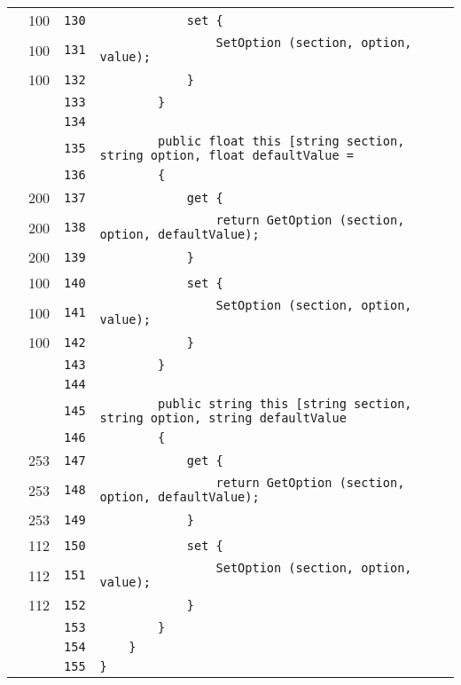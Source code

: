 \documentclass[a4paper,10pt]{article}
\begin{document}
\begin{longtable}[l]{lrrl}
\cellcolor{green} & 100 & \verb~130~ & \verb~            set {~\\
\cellcolor{green} & 100 & \verb~131~ & \verb~                SetOption (section, option, value);~\\
\cellcolor{green} & 100 & \verb~132~ & \verb~            }~\\
\cellcolor{gray} &  & \verb~133~ & \verb~        }~\\
\cellcolor{gray} &  & \verb~134~ & \verb~~\\
\cellcolor{gray} &  & \verb~135~ & \verb~        public float this [string section, string option, float defaultValue =~\\
\cellcolor{gray} &  & \verb~136~ & \verb~        {~\\
\cellcolor{green} & 200 & \verb~137~ & \verb~            get {~\\
\cellcolor{green} & 200 & \verb~138~ & \verb~                return GetOption (section, option, defaultValue);~\\
\cellcolor{green} & 200 & \verb~139~ & \verb~            }~\\
\cellcolor{green} & 100 & \verb~140~ & \verb~            set {~\\
\cellcolor{green} & 100 & \verb~141~ & \verb~                SetOption (section, option, value);~\\
\cellcolor{green} & 100 & \verb~142~ & \verb~            }~\\
\cellcolor{gray} &  & \verb~143~ & \verb~        }~\\
\cellcolor{gray} &  & \verb~144~ & \verb~~\\
\cellcolor{gray} &  & \verb~145~ & \verb~        public string this [string section, string option, string defaultValue~\\
\cellcolor{gray} &  & \verb~146~ & \verb~        {~\\
\cellcolor{green} & 253 & \verb~147~ & \verb~            get {~\\
\cellcolor{green} & 253 & \verb~148~ & \verb~                return GetOption (section, option, defaultValue);~\\
\cellcolor{green} & 253 & \verb~149~ & \verb~            }~\\
\cellcolor{green} & 112 & \verb~150~ & \verb~            set {~\\
\cellcolor{green} & 112 & \verb~151~ & \verb~                SetOption (section, option, value);~\\
\cellcolor{green} & 112 & \verb~152~ & \verb~            }~\\
\cellcolor{gray} &  & \verb~153~ & \verb~        }~\\
\cellcolor{gray} &  & \verb~154~ & \verb~    }~\\
\cellcolor{gray} &  & \verb~155~ & \verb~}~\\
\end{longtable}
\newpage
\end{document}
